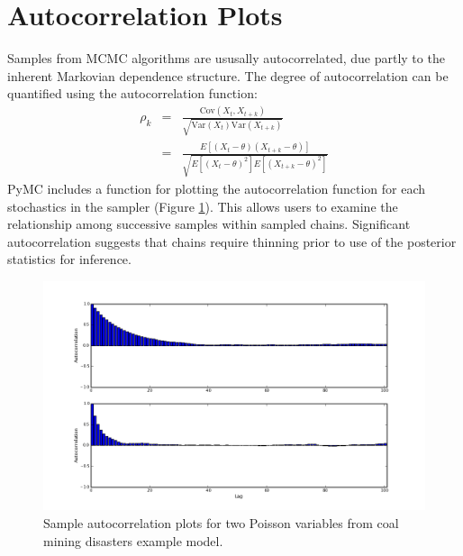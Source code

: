 
\hypertarget{autocorrelation}{}
\section*{Autocorrelation Plots} %

Samples from MCMC algorithms are ususally autocorrelated, due partly to the inherent Markovian dependence structure. The degree of autocorrelation can be quantified using the autocorrelation function:
\begin{eqnarray*}
    \rho_k &=& \frac{\mbox{Cov}(X_t, X_{t+k})}{\sqrt{\mbox{Var}(X_t)\mbox{Var}(X_{t+k})}} \\
            &=& \frac{E[(X_t - \theta)(X_{t+k} - \theta)]}{\sqrt{E[(X_t - \theta)^2] E[(X_{t+k} - \theta)^2]}}
\end{eqnarray*}
PyMC includes a function for plotting the autocorrelation function for each stochastics in the sampler (Figure \ref{fig:autocorr}). This allows users to examine the relationship among successive samples within sampled chains. Significant autocorrelation suggests that chains require thinning prior to use of the posterior statistics for inference.

\begin{figure}[h]
        \begin{center}
        \includegraphics[scale=0.4]{autocorr.png}
    \end{center}
    \caption{Sample autocorrelation plots for two Poisson variables from coal mining disasters example model.}
    \label{fig:autocorr}
\end{figure}

